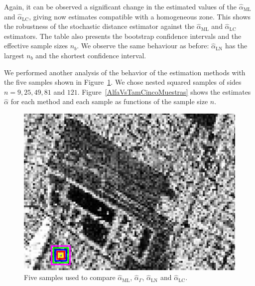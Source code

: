 \documentclass[twocolumn]{svjour3}
\begin{document}
Again, it can be observed a significant change in the estimated values of the $\widehat{\alpha}_{\text{{ML}}}$ and $\widehat{\alpha}_{\text{{LC}}}$, giving now estimates compatible with a homogeneous zone. This shows the robustness of the stochastic distance estimator against the $\widehat{\alpha}_{\text{{ML}}}$ and $\widehat{\alpha}_{\text{{LC}}}$ estimators.
The table also presents the bootstrap confidence intervals and the effective sample sizes $n_b$. 
We observe the same behaviour as before: $\widehat{\alpha}_{\text{{LN}}}$ has the largest $n_b$ and the shortest confidence interval.


We performed another analysis of the behavior of the estimation methods with the five samples shown in Figure~\ref{CincoMuestras}. 
We chose nested squared samples of sides $n=9,25,49,81$ and $121$. 
Figure~\ref{AlfaVsTamCincoMuestras} shows the estimates $\widehat{\alpha}$ for each method and each sample as functions of the sample size $n$. 

\begin{figure}[hbt]
\centering
\includegraphics[width=0.7\linewidth]{CincoMuestras}
\caption{Five samples used to compare $\widehat{\alpha}_{\text{{ML}}}$, $\widehat{\alpha}_{\Gamma}$, $\widehat{\alpha}_{\text{{LN}}}$ and  $\widehat{\alpha}_{\text{{LC}}}$.}\label{CincoMuestras}
\end{figure}
\end{document}
